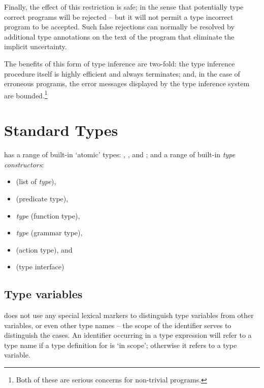 Finally, the effect of this restriction is safe; in the sense that potentially type correct programs will be rejected -- but it will not permit a type incorrect program to be accepted. Such false rejections can normally be resolved by additional type annotations on the text of the program that eliminate the implicit uncertainty.

The benefits of this form of type inference are two-fold: the type inference procedure itself is highly efficient and always terminates; and, in the case of erroneous programs, the error messages displayed by the type inference system are bounded.\footnote{Both of these are serious concerns for non-trivial programs.}

\section{Standard Types}
\label{types:types}
\go has a range of built-in `atomic' types:  , ,  and ; and a range of built-in \emph{type constructors}:
\begin{itemize}
\item
{} (list of \emph{type}), 
\item
{} (predicate type), 
\item
{}\emph{type} (function type), 
\item
{}\emph{type} (grammar type),
\item
{} (action type), and
\item
{} (type interface)
\end{itemize}

\subsection{Type variables}
\label{types:standard:variable}

\go does not use any special lexical markers to distinguish type variables from other variables, or even other type names -- the scope of the identifier serves to distinguish the cases. An identifier  occurring in a type expression will refer to a type name if a type definition for  is `in scope'; otherwise it refers to a type variable.

